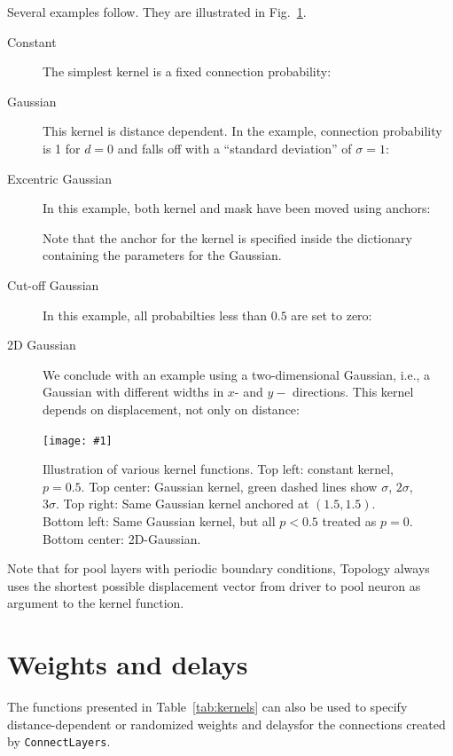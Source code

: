 \documentclass[a4paper,12pt]{report}
\newcommand{\scriptfig}[4]{%
\begin{figure}
\centerline{\texttt{[image: \#1]}}
\caption[#3]{#4}
\label{fig:#1}
\end{figure}%
}
\begin{document}
Several examples follow. They are illustrated in Fig.~\ref{fig:conn4}.
\begin{description}
\item[Constant] The simplest kernel is a fixed connection
  probability:

\item[Gaussian] This kernel is distance dependent. In the example,
  connection probability is 1 for $d=0$ and falls off with a
  ``standard deviation'' of $\sigma=1$:
 
\item[Excentric Gaussian] In this example, both kernel and mask have
  been moved using anchors:
 
Note that the anchor for the kernel is specified inside the dictionary
containing the parameters for the Gaussian.
\item[Cut-off Gaussian] In this example, all probabilties less than
  $0.5$ are set to zero:
 
\item[2D Gaussian] We conclude with an
  example using a two-dimensional Gaussian, i.e., a Gaussian with
  different widths in $x$- and $y-$ directions. This kernel depends on
  displacement, not only on distance:
 
\end{description}
\scriptfig{conn4}{0.9}{Kernel functions}%
{Illustration of various kernel functions. Top left: constant kernel,
  $p=0.5$. Top center: Gaussian kernel, green dashed lines show
  $\sigma$, $2\sigma$, $3\sigma$. Top right: Same Gaussian kernel
  anchored at $(1.5,1.5)$. Bottom left: Same Gaussian kernel, but all
  $p<0.5$ treated as $p=0$. Bottom center: 2D-Gaussian.}
Note that for pool layers with periodic boundary conditions, Topology
always uses the shortest possible displacement vector from driver
to pool neuron as argument to the kernel function.


\section{Weights and delays}\label{sec:conn_wd}

The functions presented in Table~\ref{tab:kernels} can also be used to
specify distance-dependent or randomized weights and delaysfor the connections
created by \lstinline!ConnectLayers!.
\end{document}
